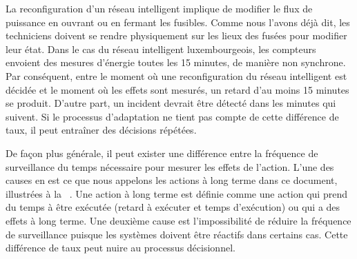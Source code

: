 %
La reconfiguration d'un réseau intelligent implique de modifier le flux de puissance en ouvrant ou en fermant les fusibles. 
Comme nous l'avons déjà dit, les techniciens doivent se rendre physiquement sur les lieux des fusées pour modifier leur état. 
Dans le cas du réseau intelligent luxembourgeois, les compteurs envoient des mesures d'énergie toutes les 15 minutes, de manière non synchrone. 
Par conséquent, entre le moment où une reconfiguration du réseau intelligent est décidée et le moment où les effets sont mesurés, un retard d'au moins 15 minutes se produit. 
D'autre part, un incident devrait être détecté dans les minutes qui suivent. 
Si le processus d'adaptation ne tient pas compte de cette différence de taux, il peut entraîner des décisions répétées.

%
De façon plus générale, il peut exister une différence entre la fréquence de surveillance du temps nécessaire pour mesurer les effets de l'action. 
L'une des causes en est ce que nous appelons les actions à long terme dans ce document, illustrées à la ~. 
Une action à long terme est définie comme une action qui prend du temps à être exécutée (retard à exécuter et temps d'exécution) ou qui a des effets à long terme.
Une deuxième cause est l'impossibilité de réduire la fréquence de surveillance puisque les systèmes doivent être réactifs dans certains cas.
Cette différence de taux peut nuire au processus décisionnel.

